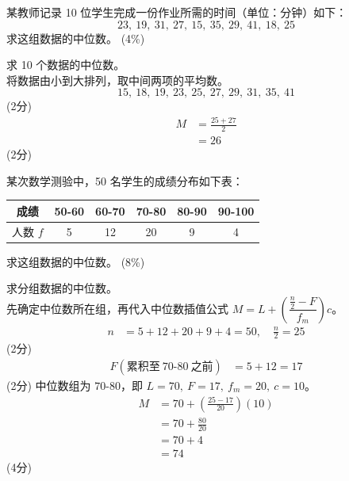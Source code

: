 \documentclass[12pt,a4paper]{exam-zh}
\begin{document}
\begin{question}[points = 4]
    某教师记录 10 位学生完成一份作业所需的时间（单位：分钟）如下：
    \[
        23,\ 19,\ 31,\ 27,\ 15,\ 35,\ 29,\ 41,\ 18,\ 25
    \]
    求这组数据的中位数。
    \hfill (4\%)
\end{question}

\begin{solution}
    求 10 个数据的中位数。 \\
    将数据由小到大排列，取中间两项的平均数。
    \[
        15,\ 18,\ 19,\ 23,\ 25,\ 27,\ 29,\ 31,\ 35,\ 41
    \]
    \hfill (2分)
    \begin{align*}
        M &= \frac{25+27}{2} \\
        &= 26
    \end{align*}
    \hfill (2分)
\end{solution}

\begin{question}[points = 8]
    某次数学测验中，50 名学生的成绩分布如下表：

    \begin{center}
    \begin{tabular}{|c|c|c|c|c|c|}
        \hline
        成绩 & 50-60 & 60-70 & 70-80 & 80-90 & 90-100 \\
        \hline
        人数 $f$ & 5 & 12 & 20 & 9 & 4 \\
        \hline
    \end{tabular}
    \end{center}

    求这组数据的中位数。
    \hfill (8\%)
\end{question}

\begin{solution}
    求分组数据的中位数。 \\
    先确定中位数所在组，再代入中位数插值公式 $M=L+\left(\dfrac{\frac{n}{2}-F}{f_m}\right)c$。
    \begin{align*}
        n &= 5+12+20+9+4 = 50, \quad \frac{n}{2}=25
    \end{align*}
    \hfill (2分)
    \begin{align*}
        F(\text{累积至}\ 70\text{-}80\ \text{之前}) &= 5+12 = 17
    \end{align*}
    \hfill (2分)
    中位数组为 $70\text{-}80$，即 $L=70,\ F=17,\ f_m=20,\ c=10$。
    \begin{align*}
        M &= 70 + \left(\frac{25-17}{20}\right)(10) \\
        &= 70 + \frac{80}{20} \\
        &= 70+4 \\
        &= 74
    \end{align*}
    \hfill (4分)
\end{solution}
\end{document}
